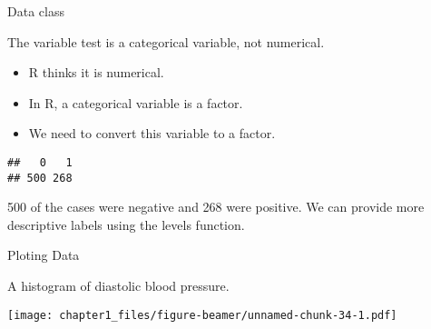 \begin{frame}[fragile]{Data class}
\protect\hypertarget{data-class}{}

The variable test is a categorical variable, not numerical.

\begin{itemize}
\tightlist
\item
  R thinks it is numerical.
\item
  In R, a categorical variable is a factor.
\item
  We need to convert this variable to a factor.
\end{itemize}

\begin{Shaded}
\begin{Highlighting}[]
\OperatorTok{$}\StringTok{ }\OperatorTok{$}
 \OperatorTok{$}
\end{Highlighting}
\end{Shaded}

\begin{verbatim}
##   0   1 
## 500 268
\end{verbatim}

500 of the cases were negative and 268 were positive. We can provide
more descriptive labels using the levels function.

\begin{Shaded}
\begin{Highlighting}[]
\OperatorTok{$}\NormalTok{(}\NormalTok{,}\NormalTok{)}
\end{Highlighting}
\end{Shaded}

\end{frame}

\begin{frame}[fragile]{Ploting Data}
\protect\hypertarget{ploting-data}{}

A histogram of diastolic blood pressure.

\begin{Shaded}
\begin{Highlighting}[]
\OperatorTok{$}\NormalTok{,}\NormalTok{)}
\end{Highlighting}
\end{Shaded}

\texttt{[image: chapter1\_files/figure-beamer/unnamed-chunk-34-1.pdf]}

\end{frame}

